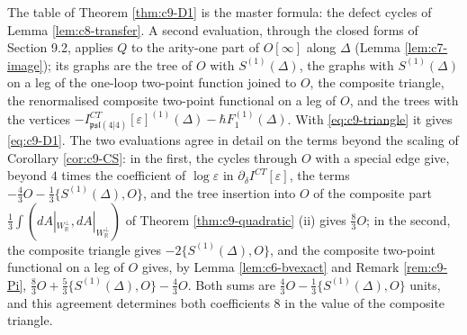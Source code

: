 \begin{remark}
\label{rem:c9-twoeval}
The table of Theorem \ref{thm:c9-D1} is the master formula: the defect cycles of Lemma \ref{lem:c8-transfer}. A second evaluation, through the closed forms of Section 9.2, applies $Q$ to the arity-one part of $O[\infty]$ along $\Delta$ (Lemma \ref{lem:c7-image}); its graphs are the tree of $O$ with $S^{(1)}(\Delta)$, the graphs with $S^{(1)}(\Delta)$ on a leg of the one-loop two-point function joined to $O$, the composite triangle, the renormalised composite two-point functional on a leg of $O$, and the trees with the vertices $-I^{CT}_{\mathfrak{psl}(4|4)}[\varepsilon]^{(1)}(\Delta)-\hbar F_1^{(1)}(\Delta)$. With \eqref{eq:c9-triangle} it gives \eqref{eq:c9-D1}. The two evaluations agree in detail on the terms beyond the scaling of Corollary \ref{cor:c9-CS}: in the first, the cycles through $O$ with a special edge give, beyond $4$ times the coefficient of $\log\varepsilon$ in $\partial_\delta I^{CT}[\varepsilon]$, the terms $-\tfrac43O-\tfrac13\{S^{(1)}(\Delta),O\}$, and the tree insertion into $O$ of the composite part $\tfrac13\int(dA|_{W_{\mathbb R}^\perp},dA|_{W_{\mathbb R}^\perp})$ of Theorem \ref{thm:c9-quadratic} (ii) gives $\tfrac83O$; in the second, the composite triangle gives $-2\{S^{(1)}(\Delta),O\}$, and the composite two-point functional on a leg of $O$ gives, by Lemma \ref{lem:c6-bvexact} and Remark \ref{rem:c9-Pi}, $\tfrac83O+\tfrac53\{S^{(1)}(\Delta),O\}-\tfrac43O$. Both sums are $\tfrac43O-\tfrac13\{S^{(1)}(\Delta),O\}$ units, and this agreement determines both coefficients $8$ in the value of the composite triangle.
\end{remark}
